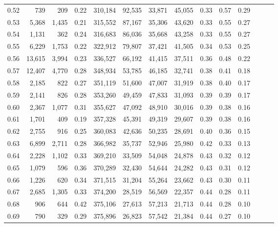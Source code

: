 \begin{tabular}{rrrrrrrrrrrrrr}
0.52 &     739 &    209 &  0.22 &  310,184 &   92,535 &  33,871 &  45,055 &  0.33 &  0.57 &      0.29 \\
0.53 &   5,368 &  1,435 &  0.21 &  315,552 &   87,167 &  35,306 &  43,620 &  0.33 &  0.55 &      0.27 \\
0.54 &   1,131 &    362 &  0.24 &  316,683 &   86,036 &  35,668 &  43,258 &  0.33 &  0.55 &      0.27 \\
0.55 &   6,229 &  1,753 &  0.22 &  322,912 &   79,807 &  37,421 &  41,505 &  0.34 &  0.53 &      0.25 \\
0.56 &  13,615 &  3,994 &  0.23 &  336,527 &   66,192 &  41,415 &  37,511 &  0.36 &  0.48 &      0.22 \\
0.57 &  12,407 &  4,770 &  0.28 &  348,934 &   53,785 &  46,185 &  32,741 &  0.38 &  0.41 &      0.18 \\
0.58 &   2,185 &    822 &  0.27 &  351,119 &   51,600 &  47,007 &  31,919 &  0.38 &  0.40 &      0.17 \\
0.59 &   2,141 &    826 &  0.28 &  353,260 &   49,459 &  47,833 &  31,093 &  0.39 &  0.39 &      0.17 \\
0.60 &   2,367 &  1,077 &  0.31 &  355,627 &   47,092 &  48,910 &  30,016 &  0.39 &  0.38 &      0.16 \\
0.61 &   1,701 &    409 &  0.19 &  357,328 &   45,391 &  49,319 &  29,607 &  0.39 &  0.38 &      0.16 \\
0.62 &   2,755 &    916 &  0.25 &  360,083 &   42,636 &  50,235 &  28,691 &  0.40 &  0.36 &      0.15 \\
0.63 &   6,899 &  2,711 &  0.28 &  366,982 &   35,737 &  52,946 &  25,980 &  0.42 &  0.33 &      0.13 \\
0.64 &   2,228 &  1,102 &  0.33 &  369,210 &   33,509 &  54,048 &  24,878 &  0.43 &  0.32 &      0.12 \\
0.65 &   1,079 &    596 &  0.36 &  370,289 &   32,430 &  54,644 &  24,282 &  0.43 &  0.31 &      0.12 \\
0.66 &   1,226 &    620 &  0.34 &  371,515 &   31,204 &  55,264 &  23,662 &  0.43 &  0.30 &      0.11 \\
0.67 &   2,685 &  1,305 &  0.33 &  374,200 &   28,519 &  56,569 &  22,357 &  0.44 &  0.28 &      0.11 \\
0.68 &     906 &    644 &  0.42 &  375,106 &   27,613 &  57,213 &  21,713 &  0.44 &  0.28 &      0.10 \\
0.69 &     790 &    329 &  0.29 &  375,896 &   26,823 &  57,542 &  21,384 &  0.44 &  0.27 &      0.10 \\

\end{tabular}
